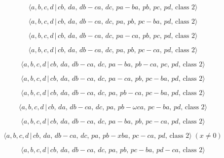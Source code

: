 \documentclass[10pt]{article}
\begin{document}
\begin{equation}
\langle a,b,c,d\,|\,cb,\,da,\,db-ca,\,dc,\,pa-ba,\,pb,\,pc,\,pd,\,\text{
class }2\rangle  \tag{6.49}
\end{equation}

\begin{equation}
\langle a,b,c,d\,|\,cb,\,da,\,db-ca,\,dc,\,pa,\,pb,\,pc-ba,\,pd,\,\text{
class }2\rangle  \tag{6.50}
\end{equation}

\begin{equation}
\langle a,b,c,d\,|\,cb,\,da,\,db-ca,\,dc,\,pa-ca,\,pb,\,pc,\,pd,\,\text{
class }2\rangle  \tag{6.51}
\end{equation}

\begin{equation}
\langle a,b,c,d\,|\,cb,\,da,\,db-ca,\,dc,\,pa,\,pb,\,pc-ca,\,pd,\,\text{
class }2\rangle  \tag{6.52}
\end{equation}

\begin{equation}
\langle a,b,c,d\,|\,cb,\,da,\,db-ca,\,dc,\,pa-ba,\,pb-ca,\,pc,\,pd,\,\text{
class }2\rangle  \tag{6.53}
\end{equation}

\begin{equation}
\langle a,b,c,d\,|\,cb,\,da,\,db-ca,\,dc,\,pa-ca,\,pb,\,pc-ba,\,pd,\,\text{
class }2\rangle  \tag{6.54}
\end{equation}

\begin{equation}
\langle a,b,c,d\,|\,cb,\,da,\,db-ca,\,dc,\,pa,\,pb-ca,\,pc-ba,\,pd,\,\text{
class }2\rangle  \tag{6.55}
\end{equation}

\begin{equation}
\langle a,b,c,d\,|\,cb,\,da,\,db-ca,\,dc,\,pa,\,pb-\omega ca,\,pc-ba,\,pd,\,%
\text{class }2\rangle  \tag{6.56}
\end{equation}

\begin{equation}
\langle a,b,c,d\,|\,cb,\,da,\,db-ca,\,dc,\,pa-ba,\,pb,\,pc-ca,\,pd,\,\text{
class }2\rangle  \tag{6.57}
\end{equation}

\begin{equation}
\langle a,b,c,d\,|\,cb,\,da,\,db-ca,\,dc,\,pa,\,pb-xba,\,pc-ca,\,pd,\,\text{
class }2\rangle\;(x \neq 0)  \tag{6.58}
\end{equation}

\begin{equation}
\langle a,b,c,d\,|\,cb,\,da,\,db-ca,\,dc,\,pa,\,pb,\,pc-ba,\,pd-ca,\,\text{
class }2\rangle  \tag{6.59}
\end{equation}
\end{document}
